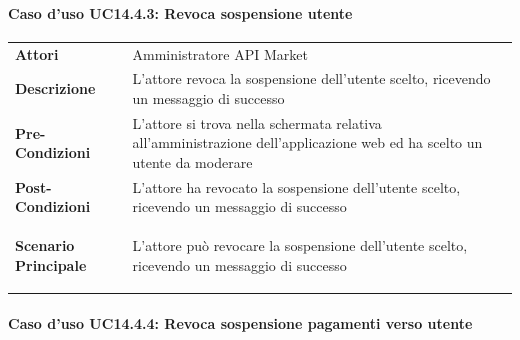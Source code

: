 \paragraph{Caso d'uso UC14.4.3: Revoca sospensione utente}
\label{UC14_4_3}

\begin{minipage}{\linewidth}
	\begin{tabular}{ l | p{11cm}}
		\hline
		\rowcolor{Gray}
		\multicolumn{2}{c}{UC14.4.3 - Revoca sospensione utente} \\
		\hline
		\textbf{Attori} & Amministratore API Market \\
		\textbf{Descrizione} & L'attore revoca la sospensione dell'utente scelto, ricevendo un messaggio di successo \\
		\textbf{Pre-Condizioni} & L'attore si trova nella schermata relativa all'amministrazione dell'applicazione web ed ha scelto un utente da moderare \\
		\textbf{Post-Condizioni} & L'attore ha revocato la sospensione dell'utente scelto, ricevendo un messaggio di successo \\
		\textbf{Scenario Principale} & 
		\begin{enumerate*}[label=(\arabic*.),itemjoin={\newline}]
			\item L'attore può revocare la sospensione dell'utente scelto, ricevendo un messaggio di successo
		\end{enumerate*}\\
	\end{tabular}
\end{minipage}

\paragraph{Caso d'uso UC14.4.4: Revoca sospensione pagamenti verso utente}
\label{UC14_4_4}

